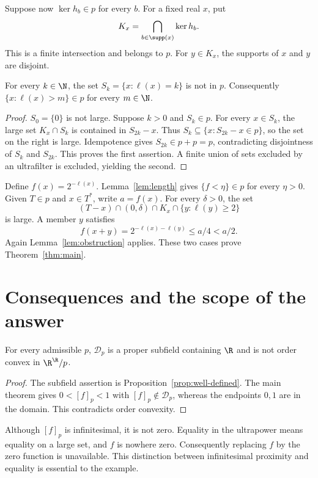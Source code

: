 \documentclass[11pt]{article}
\begin{document}
Suppose now $\ker h_b\in p$ for every $b$. For a fixed real $x$, put
\[
 K_x=\bigcap_{b\in\supp(x)}\ker h_b.
\]
This is a finite intersection and belongs to $p$. For $y\in K_x$, the
supports of $x$ and $y$ are disjoint.

\begin{lemma}\label{lem:length}
For every $k\in\N$, the set $S_k=\{x:\ell(x)=k\}$ is not in $p$.
Consequently $\{x:\ell(x)>m\}\in p$ for every $m\in\N$.
\end{lemma}
\begin{proof}
$S_0=\{0\}$ is not large. Suppose $k>0$ and $S_k\in p$. For every
$x\in S_k$, the large set $K_x\cap S_k$ is contained in $S_{2k}-x$.
Thus
$S_k\subseteq\{x:S_{2k}-x\in p\}$, so the set on the right is large.
Idempotence gives $S_{2k}\in p+p=p$, contradicting disjointness of
$S_k$ and $S_{2k}$. This proves the first assertion. A finite union of
sets excluded by an ultrafilter is excluded, yielding the second.
\end{proof}

Define $f(x)=2^{-\ell(x)}$. Lemma~\ref{lem:length} gives
$\{f<\eta\}\in p$ for every $\eta>0$. Given $T\in p$ and $x\in T^*$,
write $a=f(x)$. For every $\delta>0$, the set
\[
 (T-x)\cap(0,\delta)\cap K_x\cap\{y:\ell(y)\ge2\}
\]
is large. A member $y$ satisfies
\[
 f(x+y)=2^{-\ell(x)-\ell(y)}\le a/4<a/2.
\]
Again Lemma~\ref{lem:obstruction} applies. These two cases prove
Theorem~\ref{thm:main}.

\section{Consequences and the scope of the answer}

\begin{corollary}
For every admissible $p$, $\mathcal D_p$ is a proper subfield containing
$\R$ and is not order convex in $\R^{\R}/p$.
\end{corollary}
\begin{proof}
The subfield assertion is Proposition~\ref{prop:well-defined}. The main
theorem gives $0<[f]_p<1$ with $[f]_p\notin\mathcal D_p$, whereas the
endpoints $0,1$ are in the domain. This contradicts order convexity.
\end{proof}

Although $[f]_p$ is infinitesimal, it is not zero. Equality in the
ultrapower means equality on a large set, and $f$ is nowhere zero.
Consequently replacing $f$ by the zero function is unavailable. This
distinction between infinitesimal proximity and equality is essential
to the example.
\end{document}
